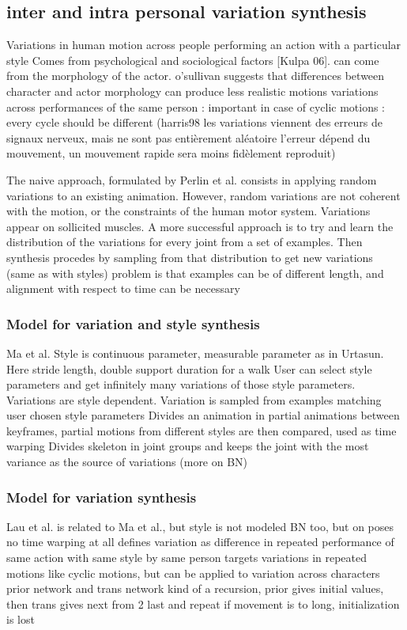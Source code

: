 \documentclass[11pt]{sdm_internship}
\begin{document}
{\subsection{inter and intra personal variation synthesis}

Variations in human motion across people performing an action with a particular style
Comes from psychological and sociological factors [Kulpa 06]. can come from the morphology of the actor.
o'sullivan suggests that differences between character and actor morphology can produce less realistic motions
variations across performances of the same person : important in case of cyclic motions : every cycle should be different
(harris98 les variations viennent des erreurs de signaux nerveux, mais ne sont pas entièrement aléatoire
l'erreur dépend du mouvement, un mouvement rapide sera moins fidèlement reproduit)


The naive approach, formulated by Perlin et al. consists in applying random variations to an existing animation. However, random variations are not coherent with the motion, or the constraints of the human motor system. 
Variations appear on sollicited muscles. 
A more successful approach is to try and learn the distribution of the variations for every joint from a set of examples. Then synthesis procedes by sampling from that distribution to get new variations
(same as with styles) problem is that examples can be of different length, and alignment with respect to time can be necessary

\subsubsection{Model for variation and style synthesis}
Ma et al.
Style is continuous parameter, measurable parameter as in Urtasun. Here stride length, double support duration for a walk
User can select style parameters and get infinitely many variations of those style parameters.
Variations are style dependent. Variation is sampled from examples matching user chosen style parameters
Divides an animation in partial animations between keyframes, partial motions from different styles are then compared, used as time warping
Divides skeleton in joint groups and keeps the joint with the most variance as the source of variations
(more on BN)

\subsubsection{Model for variation synthesis}
Lau et al.
is related to Ma et al., but style is not modeled
BN too, but on poses
no time warping at all
defines variation as difference in repeated performance of same action with same style by same person
targets variations in repeated motions like cyclic motions, but can be applied to variation across characters 
prior network and trans network 
kind of a recursion, prior gives initial values, then trans gives next from 2 last and repeat
if movement is to long, initialization is lost

}
\end{document}
